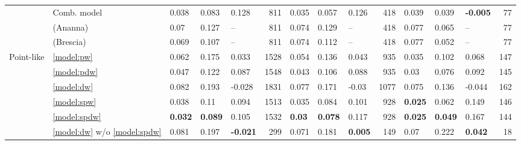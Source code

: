 \documentclass[fleqn,usenatbib]{mnras}
\begin{document}
\begin{table}
\begin{tabular}{lllllrlllrlllr}
                       & Comb. model &              0.038 &           0.083 &            0.128 &         811 &              0.035 &           0.057 &           0.126 &         418 &              0.039 &           0.039 &  \textbf{-0.005} &          77 \\
                       & (Ananna) &               0.07 &           0.127 &           -- &         811 &              0.074 &           0.129 &          -- &         418 &              0.077 &           0.065 &           -- &          77 \\
                       & (Brescia) &              0.069 &           0.107 &           -- &         811 &              0.074 &           0.112 &          -- &         418 &              0.077 &           0.052 &           -- &          77 \\
            Point-like & \ref{model:pw} &              0.062 &           0.175 &            0.033 &        1528 &              0.054 &           0.136 &           0.043 &         935 &              0.035 &           0.102 &            0.068 &         147 \\
                       & \ref{model:pdw} &              0.047 &           0.122 &            0.087 &        1548 &              0.043 &           0.106 &           0.088 &         935 &               0.03 &           0.076 &            0.092 &         145 \\
                       & \ref{model:dw} &              0.082 &           0.193 &           -0.028 &        1831 &              0.077 &           0.171 &           -0.03 &        1077 &              0.075 &           0.136 &           -0.044 &         162 \\
                       & \ref{model:spw} &              0.038 &            0.11 &            0.094 &        1513 &              0.035 &           0.084 &           0.101 &         928 &     \textbf{0.025} &           0.062 &            0.149 &         146 \\
                       & \ref{model:spdw} &     \textbf{0.032} &  \textbf{0.089} &            0.105 &        1532 &      \textbf{0.03} &  \textbf{0.078} &           0.117 &         928 &     \textbf{0.025} &  \textbf{0.049} &            0.167 &         144 \\
                       & \ref{model:dw} w/o \ref{model:spdw} &              0.081 &           0.197 &  \textbf{-0.021} &         299 &              0.071 &           0.181 &  \textbf{0.005} &         149 &               0.07 &           0.222 &   \textbf{0.042} &          18 \\

\end{tabular}
\end{table}
\end{document}
